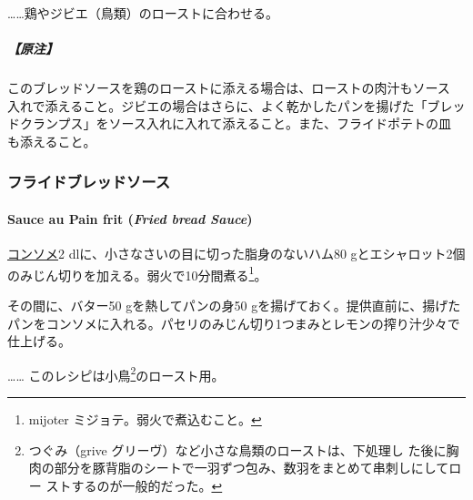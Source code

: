 \begin{recette}
\ldots{}\ldots{}鶏やジビエ（鳥類）のローストに合わせる。

\hypertarget{ux539fux6ce8}{%
\subparagraph{【原注】}\label{ux539fux6ce8}}

このブレッドソースを鶏のローストに添える場合は、ローストの肉汁もソース
入れで添えること。ジビエの場合はさらに、よく乾かしたパンを揚げた「ブレッ
ドクランプス」をソース入れに入れて添えること。また、フライドポテトの皿
も添えること。

\maeaki

\hypertarget{ux30d5ux30e9ux30a4ux30c9ux30d6ux30ecux30c3ux30c9ux30bdux30fcux30b9}{%
\subsubsection{フライドブレッドソース}\label{ux30d5ux30e9ux30a4ux30c9ux30d6ux30ecux30c3ux30c9ux30bdux30fcux30b9}}

\hypertarget{fried-bread-sauce}{%
\paragraph{\texorpdfstring{Sauce au Pain frit (\emph{Fried bread
Sauce})}{Sauce au Pain frit (Fried bread Sauce)}}\label{fried-bread-sauce}}


\protect\hyperlink{}{コンソメ}2
dlに、小さなさいの目に切った脂身のないハム80
gとエシャロット2個のみじん切りを加える。弱火で10分間煮る\footnote{mijoter
  ミジョテ。弱火で煮込むこと。}。

その間に、バター50 gを熱してパンの身50
gを揚げておく。提供直前に、揚げたパンをコンソメに入れる。パセリのみじん切り1つまみとレモンの搾り汁少々で仕上げる。

\ldots{}\ldots{} このレシピは小鳥\footnote{つぐみ（grive
  グリーヴ）など小さな鳥類のローストは、下処理し
  た後に胸肉の部分を豚背脂のシートで一羽ずつ包み、数羽をまとめて串刺しにしてロー
  ストするのが一般的だった。}のロースト用。


\end{recette}
